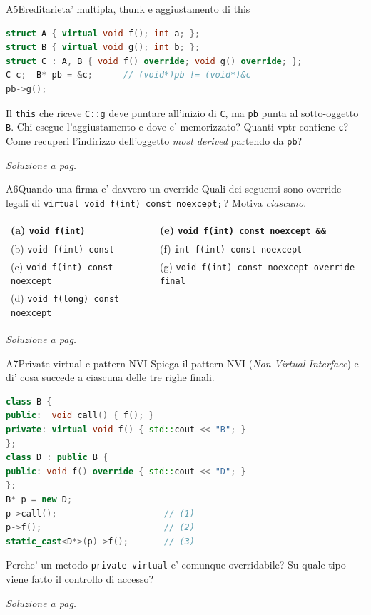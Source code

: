 \documentclass{report}
\newcommand{\code}[1]{\texttt{\small #1}}
\newcommand{\vaisol}[1]{%
    \par\vspace{4pt}\hfill{\footnotesize\itshape\color{gray}%
    Soluzione a pag.~\pageref{sol:#1}}%
}
\begin{document}
\begin{domanda}{A5}{Ereditarieta' multipla, thunk e aggiustamento di this}
\begin{lstlisting}[language=C++]
struct A { virtual void f(); int a; };
struct B { virtual void g(); int b; };
struct C : A, B { void f() override; void g() override; };
C c;  B* pb = &c;      // (void*)pb != (void*)&c
pb->g();
\end{lstlisting}
Il \code{this} che riceve \code{C::g} deve puntare all'inizio di \code{C}, ma
\code{pb} punta al sotto-oggetto \code{B}. Chi esegue l'aggiustamento e dove e'
memorizzato? Quanti vptr contiene \code{c}? Come recuperi l'indirizzo
dell'oggetto \emph{most derived} partendo da \code{pb}?
\vaisol{A5}
\end{domanda}

\begin{domanda}{A6}{Quando una firma e' davvero un override}
Quali dei seguenti sono override legali di
\code{virtual void f(int) const noexcept;}\,? Motiva \emph{ciascuno}.
\begin{center}
\footnotesize
\begin{tabular}{|l|l|}
\hline
(a) \code{void f(int)}                    & (e) \code{void f(int) const noexcept \&\&} \\
\hline
(b) \code{void f(int) const}              & (f) \code{int f(int) const noexcept} \\
\hline
(c) \code{void f(int) const noexcept}     & (g) \code{void f(int) const noexcept override final} \\
\hline
(d) \code{void f(long) const noexcept}    & \\
\hline
\end{tabular}
\end{center}
\vaisol{A6}
\end{domanda}

\begin{domanda}{A7}{Private virtual e pattern NVI}
Spiega il pattern NVI (\emph{Non-Virtual Interface}) e di' cosa succede a
ciascuna delle tre righe finali.
\begin{lstlisting}[language=C++]
class B {
public:  void call() { f(); }
private: virtual void f() { std::cout << "B"; }
};
class D : public B {
public: void f() override { std::cout << "D"; }
};
B* p = new D;
p->call();                     // (1)
p->f();                        // (2)
static_cast<D*>(p)->f();       // (3)
\end{lstlisting}
Perche' un metodo \code{private virtual} e' comunque overridabile? Su quale
tipo viene fatto il controllo di accesso?
\vaisol{A7}
\end{domanda}
\end{document}
